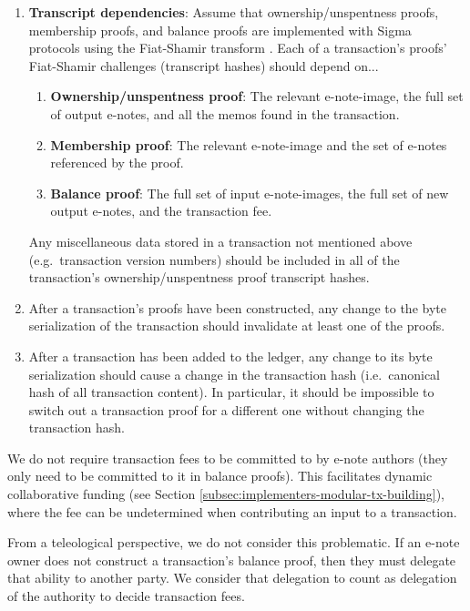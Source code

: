 \begin{enumerate}
    \item \textbf{Transcript dependencies}: Assume that ownership/unspentness proofs, membership proofs, and balance proofs are implemented with Sigma protocols using the Fiat-Shamir transform \cite{fiat-shamir-transform}. Each of a transaction's proofs' Fiat-Shamir challenges (transcript hashes) should depend on...

    \begin{enumerate}
        \item \textbf{Ownership/unspentness proof}: The relevant e-note-image, the full set of output e-notes, and all the memos found in the transaction.
        \item \textbf{Membership proof}: The relevant e-note-image and the set of e-notes referenced by the proof.
        \item \textbf{Balance proof}: The full set of input e-note-images, the full set of new output e-notes, and the transaction fee.
    \end{enumerate}

    Any miscellaneous data stored in a transaction not mentioned above (e.g.\ transaction version numbers) should be included in all of the transaction's ownership/unspentness proof transcript hashes.

    \item After a transaction's proofs have been constructed, any change to the byte serialization of the transaction should invalidate at least one of the proofs.

    \item After a transaction has been added to the ledger, any change to its byte serialization should cause a change in the transaction hash (i.e.\ canonical hash of all transaction content). In particular, it should be impossible to switch out a transaction proof for a different one without changing the transaction hash.
\end{enumerate}

We do not require transaction fees to be committed to by e-note authors (they only need to be committed to it in balance proofs). This facilitates dynamic collaborative funding (see Section \ref{subsec:implementers-modular-tx-building}), where the fee can be undetermined when contributing an input to a transaction.

From a teleological perspective, we do not consider this problematic. If an e-note owner does not construct a transaction's balance proof, then they must delegate that ability to another party. We consider that delegation to count as delegation of the authority to decide transaction fees.


